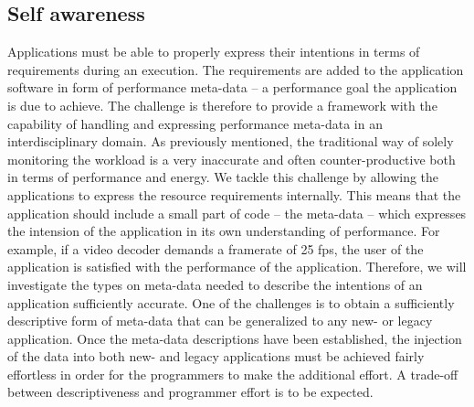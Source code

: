 \documentclass{article}
\begin{document}
\subsection{Self awareness}
\label{sec:self}
Applications must be able to properly express their intentions in terms of requirements during an execution. 
The requirements are added to the application software in form of performance meta-data -- a performance goal the application is due to achieve. 
The challenge is therefore to provide a framework with the capability of handling and expressing performance meta-data in an interdisciplinary domain.
As previously mentioned, the traditional way of solely monitoring the workload is a very inaccurate and often counter-productive both in terms of performance and energy.
We tackle this challenge by allowing the applications to express the resource requirements internally.
This means that the application should include a small part of code -- the meta-data -- which expresses the intension of the application in its own understanding of performance.
For example, if a video decoder demands a framerate of 25 fps, the user of the application is satisfied with the performance of the application.
Therefore, we will investigate the types on meta-data needed to describe the intentions of an application sufficiently accurate.
One of the challenges is to obtain a sufficiently descriptive form of meta-data that can be generalized to any new- or legacy application.
Once the meta-data descriptions have been established, the injection of the data into both new- and legacy applications must be achieved fairly effortless in order for the programmers to make the additional effort.
A trade-off between descriptiveness and programmer effort is to be expected.
\end{document}
